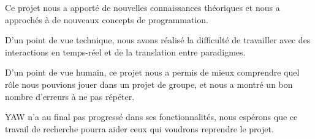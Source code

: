 \documentclass{report}
\begin{document}
Ce projet nous a apporté de nouvelles connaissances théoriques et nous a
approchés à de nouveaux concepts de programmation.

D'un point de vue technique, nous avons réalisé la difficulté de travailler avec
des interactions en temps-réel et de la translation entre paradigmes.

D'un point de vue humain, ce projet nous a permis de mieux comprendre quel rôle
nous pouvions jouer dans un projet de groupe, et nous a montré un bon nombre
d'erreurs à ne pas répéter.

YAW n'a au final pas progressé dans ses fonctionnalités, nous espérons que ce
travail de recherche pourra aider ceux qui voudrons reprendre le projet.


\printbibliography
\end{document}

